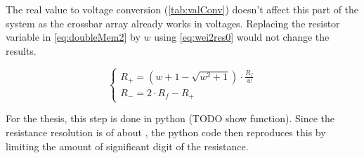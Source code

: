 The real value to voltage conversion (\cref{tab:valConv}) doesn't affect this part of the system as the crossbar array already works in voltages. Replacing the resistor variable in \cref{eq:doubleMem2} by $w$ using \cref{eq:wei2res0} would not change the results.

\begin{equation}
  \label{eq:wei2res2}
  \begin{cases}
    R_+= (w+1-\sqrt{w^2+1})\cdot\frac{R_f}{w}\\
    R_-=2\cdot R_f -R_+
  \end{cases}
\end{equation}

For the thesis, this step is done in python (TODO show function). Since the resistance resolution is of about%
, the python code then reproduces this by limiting the amount of significant digit of the resistance.
